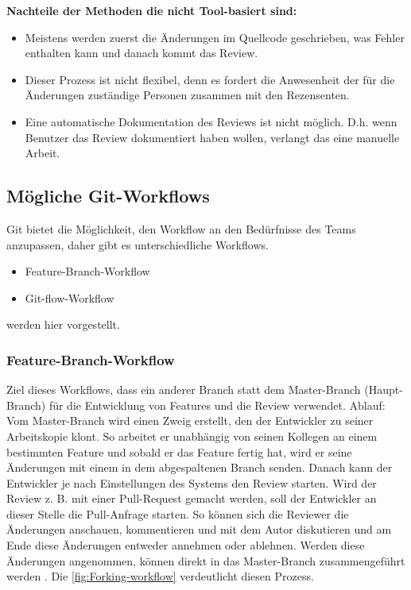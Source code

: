 \textbf{Nachteile der Methoden die nicht Tool-basiert sind:}
\begin{itemize}
	\item Meistens werden zuerst die Änderungen im Quellcode geschrieben, was Fehler enthalten kann und danach kommt das Review.
	\item Dieser Prozess ist nicht flexibel, denn es fordert die Anwesenheit der für die Änderungen zuständige Personen zusammen mit den Rezensenten.
	\item Eine automatische Dokumentation des Reviews ist nicht möglich. D.h. wenn Benutzer das Review dokumentiert haben wollen, verlangt das eine manuelle Arbeit.
\end{itemize}

\subsection{Mögliche Git-Workflows}
\label{sec:Git-Workflows}

Git bietet die Möglichkeit, den Workflow an den Bedürfnisse des Teams anzupassen, daher gibt es unterschiedliche Workflows.

\begin{itemize}
	\item Feature-Branch-Workflow
	\item Git-flow-Workflow
\end{itemize}
werden hier vorgestellt.

\subsubsection{Feature-Branch-Workflow}
\label{subsubsec:Feature-Branch-Workflow}

Ziel dieses Workflows, dass ein anderer Branch statt dem Master-Branch (Haupt-Branch) für die Entwicklung von Features und die Review verwendet.
Ablauf: Vom Master-Branch wird einen Zweig erstellt, den der Entwickler zu seiner Arbeitskopie klont. So arbeitet er unabhängig von seinen Kollegen an einem bestimmten Feature und 		sobald er das Feature fertig hat, wird er seine Änderungen mit einem  in dem abgespaltenen Branch senden. Danach kann der Entwickler je nach Einstellungen des Systems den 	Review starten. Wird der Review z. B. mit einer Pull-Request gemacht werden, soll der Entwickler an dieser Stelle die Pull-Anfrage starten. So können sich die Reviewer die 				Änderungen anschauen, kommentieren und mit dem Autor diskutieren und am Ende diese Änderungen entweder annehmen oder ablehnen. Werden diese Änderungen angenommen, können direkt in 		das Master-Branch zusammengeführt werden \cite{Feature-Branch-Workflow}. Die \cref{fig:Forking-workflow} verdeutlicht diesen Prozess. 

